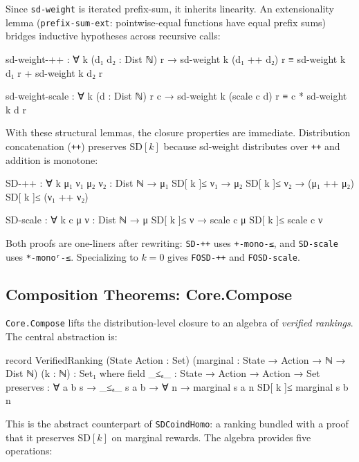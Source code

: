 \documentclass[9pt,a4paper]{article}
\theoremstyle{plain}
\theoremstyle{definition}
\theoremstyle{remark}
\begin{document}
\noindent Since \texttt{sd-weight} is iterated prefix-sum, it inherits linearity.  An extensionality lemma (\texttt{prefix-sum-ext}: pointwise-equal functions have equal prefix sums) bridges inductive hypotheses across recursive calls:

\begin{spec}
  sd-weight-++ : ∀ k (d₁ d₂ : Dist ℕ) r →
    sd-weight k (d₁ ++ d₂) r ≡ sd-weight k d₁ r + sd-weight k d₂ r

  sd-weight-scale : ∀ k (d : Dist ℕ) r c →
    sd-weight k (scale c d) r ≡ c * sd-weight k d r
\end{spec}

\noindent With these structural lemmas, the closure properties are immediate.  Distribution concatenation (\texttt{++}) preserves SD$[k]$ because sd-weight distributes over \texttt{++} and addition is monotone:

\begin{spec}
  SD-++ : ∀ k {μ₁ ν₁ μ₂ ν₂ : Dist ℕ} →
    μ₁ SD[ k ]≤ ν₁ → μ₂ SD[ k ]≤ ν₂ →
    (μ₁ ++ μ₂) SD[ k ]≤ (ν₁ ++ ν₂)

  SD-scale : ∀ k c {μ ν : Dist ℕ} →
    μ SD[ k ]≤ ν → scale c μ SD[ k ]≤ scale c ν
\end{spec}

\noindent Both proofs are one-liners after rewriting: \texttt{SD-++} uses \texttt{+-mono-≤}, and \texttt{SD-scale} uses \texttt{*-monoʳ-≤}.  Specializing to $k{=}0$ gives \texttt{FOSD-++} and \texttt{FOSD-scale}.

\subsection{Composition Theorems: Core.Compose}

\texttt{Core.Compose} lifts the distribution-level closure to an algebra of \emph{verified rankings}.  The central abstraction is:

\begin{spec}
  record VerifiedRanking
    (State Action : Set)
    (marginal : State → Action → ℕ → Dist ℕ)
    (k : ℕ) : Set₁ where
    field
      _≤ₐ_     : State → Action → Action → Set
      preserves : ∀ a b s → _≤ₐ_ s a b →
                  ∀ n → marginal s a n SD[ k ]≤ marginal s b n
\end{spec}

\noindent This is the abstract counterpart of \texttt{SDCoindHomo}: a ranking bundled with a proof that it preserves SD$[k]$ on marginal rewards.  The algebra provides five operations:
\end{document}
